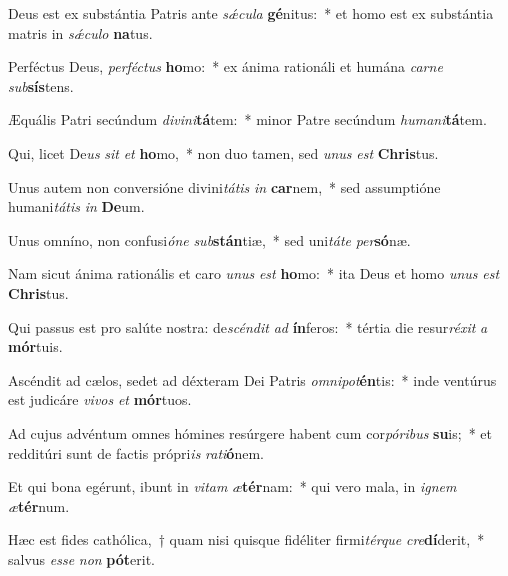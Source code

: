 \item Deus est ex substántia Patris ante \textit{sǽ}\textit{cu}\textit{la} \textbf{gé}nitus:~* et homo est ex substántia matris in \textit{sǽ}\textit{cu}\textit{lo} \textbf{na}tus.
\item Perféctus Deus, \textit{per}\textit{féc}\textit{tus} \textbf{ho}mo:~* ex ánima rationáli et humána \textit{car}\textit{ne} \textit{sub}\textbf{sís}tens.
\item Æquális Patri secúndum \textit{di}\textit{vi}\textit{ni}\textbf{tá}tem:~* minor Patre secúndum \textit{hu}\textit{ma}\textit{ni}\textbf{tá}tem.
\item Qui, licet De\textit{us} \textit{sit} \textit{et} \textbf{ho}mo,~* non duo tamen, sed \textit{u}\textit{nus} \textit{est} \textbf{Chris}tus.
\item Unus autem non conversióne divini\textit{tá}\textit{tis} \textit{in} \textbf{car}nem,~* sed assumptióne humani\textit{tá}\textit{tis} \textit{in} \textbf{De}um.
\item Unus omníno, non confusi\textit{ó}\textit{ne} \textit{sub}\textbf{stán}tiæ,~* sed uni\textit{tá}\textit{te} \textit{per}\textbf{só}næ.
\item Nam sicut ánima rationális et caro \textit{u}\textit{nus} \textit{est} \textbf{ho}mo:~* ita Deus et homo \textit{u}\textit{nus} \textit{est} \textbf{Chris}tus.
\item Qui passus est pro salúte nostra: de\textit{scén}\textit{dit} \textit{ad} \textbf{ín}feros:~* tértia die resur\textit{ré}\textit{xit} \textit{a} \textbf{mór}tuis.
\item Ascéndit ad cælos, sedet ad déxteram Dei Patris \textit{om}\textit{ni}\textit{pot}\textbf{én}tis:~* inde ventúrus est judicáre \textit{vi}\textit{vos} \textit{et} \textbf{mór}tuos.
\item Ad cujus advéntum omnes hómines resúrgere habent cum cor\textit{pó}\textit{ri}\textit{bus} \textbf{su}is;~* et redditúri sunt de factis própri\textit{is} \textit{ra}\textit{ti}\textbf{ó}nem.
\item Et qui bona egérunt, ibunt in \textit{vi}\textit{tam} \textit{æ}\textbf{tér}nam:~* qui vero mala, in \textit{i}\textit{gnem} \textit{æ}\textbf{tér}num.
\item Hæc est fides cathólica,~† quam nisi quisque fidéliter firmi\textit{tér}\textit{que} \textit{cre}\textbf{dí}derit,~* salvus \textit{es}\textit{se} \textit{non} \textbf{pót}erit.
